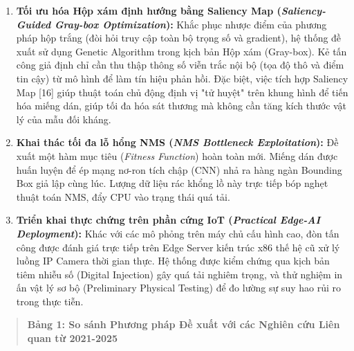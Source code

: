 \begin{enumerate}
\def\labelenumi{\arabic{enumi}.}
\item
  \textbf{Tối ưu hóa Hộp xám định hướng bằng Saliency Map
  (\emph{Saliency-Guided Gray-box Optimization}):} Khắc phục nhược điểm
  của phương pháp hộp trắng (đòi hỏi truy cập toàn bộ trọng số và
  gradient), hệ thống đề xuất sử dụng Genetic Algorithm trong kịch bản
  Hộp xám (Gray-box). Kẻ tấn công giả định chỉ cần thu thập thông số
  viễn trắc nội bộ (tọa độ thô và điểm tin cậy) từ mô hình để làm tín
  hiệu phản hồi. Đặc biệt, việc tích hợp Saliency Map {[}16{]} giúp
  thuật toán chủ động định vị "tử huyệt" trên khung hình để tiến hóa
  miếng dán, giúp tối đa hóa sát thương mà không cần tăng kích thước vật
  lý của mẫu đối kháng.
\item
  \textbf{Khai thác tối đa lỗ hổng NMS (\emph{NMS Bottleneck
  Exploitation}):} Đề xuất một hàm mục tiêu (\emph{Fitness Function})
  hoàn toàn mới. Miếng dán được huấn luyện để ép mạng nơ-ron tích chập
  (CNN) nhả ra hàng ngàn Bounding Box giả lập cùng lúc. Lượng dữ liệu
  rác khổng lồ này trực tiếp bóp nghẹt thuật toán NMS, đẩy CPU vào trạng
  thái quá tải.
\item
  \textbf{Triển khai thực chứng trên phần cứng IoT (\emph{Practical
  Edge-AI Deployment}):} Khác với các mô phỏng trên máy chủ cấu hình
  cao, đòn tấn công được đánh giá trực tiếp trên Edge Server kiến trúc
  x86 thế hệ cũ xử lý luồng IP Camera thời gian thực. Hệ thống được kiểm
  chứng qua kịch bản tiêm nhiễu số (Digital Injection) gây quá tải
  nghiêm trọng, và thử nghiệm in ấn vật lý sơ bộ (Preliminary Physical
  Testing) để đo lường sự suy hao rủi ro trong thực tiễn.
\end{enumerate}

\begin{quote}
\textbf{Bảng 1: So sánh Phương pháp Đề xuất với các Nghiên cứu Liên quan
từ 2021-2025}
\end{quote}

